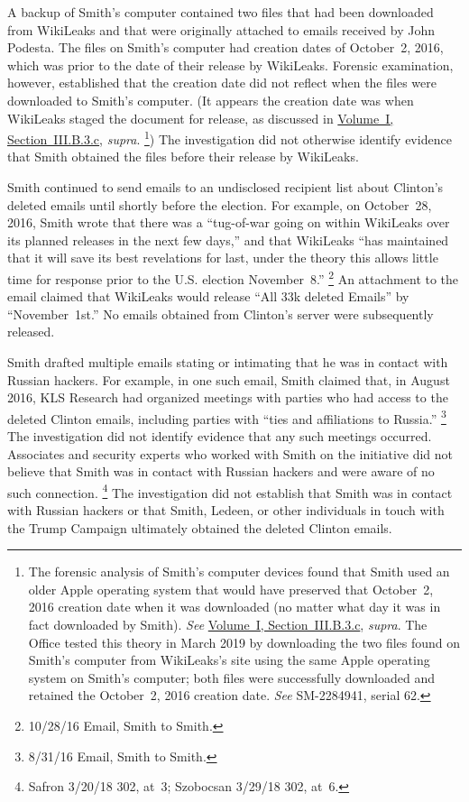A backup of Smith's computer contained two files that had been downloaded from WikiLeaks and that were originally attached to emails received by John Podesta.
The files on Smith's computer had creation dates of October~2, 2016, which was prior to the date of their release by WikiLeaks.
Forensic examination, however, established that the creation date did not reflect when the files were downloaded to Smith's computer.
(It appears the creation date was when WikiLeaks staged the document for release, as discussed in \hyperlink{paragraph.1.3.2.3.3}{Volume~I, Section~III.B.3.c}, \textit{supra}.%
\footnote{The forensic analysis of Smith's computer devices found that Smith used an older Apple operating system that would have preserved that October~2, 2016 creation date when it was downloaded (no matter what day it was in fact downloaded by Smith).
\textit{See} \hyperlink{paragraph.1.3.2.3}{Volume~I, Section~III.B.3.c}, \textit{supra}.
The Office tested this theory in March 2019 by downloading the two files found on Smith's computer from WikiLeaks's site using the same Apple operating system on Smith's computer;
both files were successfully downloaded and retained the October~2, 2016 creation date.
\textit{See} SM-2284941, serial 62.
})
The investigation did not otherwise identify evidence that Smith obtained the files before their release by WikiLeaks.

Smith continued to send emails to an undisclosed recipient list about Clinton's deleted emails until shortly before the election.
For example, on October~28, 2016, Smith wrote that there was a ``tug-of-war going on within WikiLeaks over its planned releases in the next few days,'' and that WikiLeaks ``has maintained that it will save its best revelations for last, under the theory this allows little time for response prior to the U.S. election November~8.''%
\footnote{10/28/16 Email, Smith to Smith.}
An attachment to the email claimed that WikiLeaks would release ``All 33k deleted Emails'' by ``November~1st.''
No emails obtained from Clinton's server were subsequently released.

Smith drafted multiple emails stating or intimating that he was in contact with Russian hackers.
For example, in one such email, Smith claimed that, in August 2016, KLS Research had organized meetings with parties who had access to the deleted Clinton emails, including parties with ``ties and affiliations to Russia.''%
\footnote{8/31/16 Email, Smith to Smith.}
The investigation did not identify evidence that any such meetings occurred.
Associates and security experts who worked with Smith on the initiative did not believe that Smith was in contact with Russian hackers and were aware of no such connection.%
\footnote{Safron 3/20/18 302, at~3; Szobocsan 3/29/18 302, at~6.}
The investigation did not establish that Smith was in contact with Russian hackers or that Smith, Ledeen, or other individuals in touch with the Trump Campaign ultimately obtained the deleted Clinton emails.

